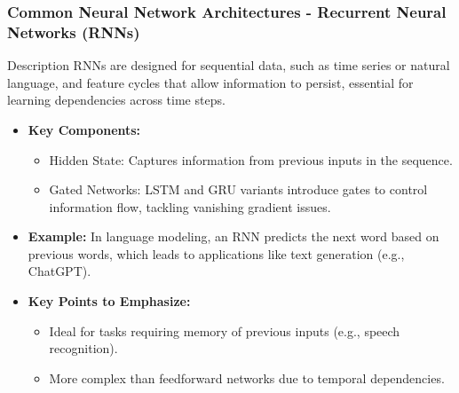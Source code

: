 \documentclass[aspectratio=169]{beamer}
\begin{document}
\begin{frame}[fragile]
    \frametitle{Common Neural Network Architectures - Recurrent Neural Networks (RNNs)}
    \begin{block}{Description}
        RNNs are designed for sequential data, such as time series or natural language, and feature cycles that allow information to persist, essential for learning dependencies across time steps.
    \end{block}

    \begin{itemize}
        \item \textbf{Key Components:}
            \begin{itemize}
                \item Hidden State: Captures information from previous inputs in the sequence.
                \item Gated Networks: LSTM and GRU variants introduce gates to control information flow, tackling vanishing gradient issues.
            \end{itemize}
        \item \textbf{Example:} In language modeling, an RNN predicts the next word based on previous words, which leads to applications like text generation (e.g., ChatGPT).
        \item \textbf{Key Points to Emphasize:}
            \begin{itemize}
                \item Ideal for tasks requiring memory of previous inputs (e.g., speech recognition).
                \item More complex than feedforward networks due to temporal dependencies.
            \end{itemize}
    \end{itemize}
\end{frame}
\end{document}
